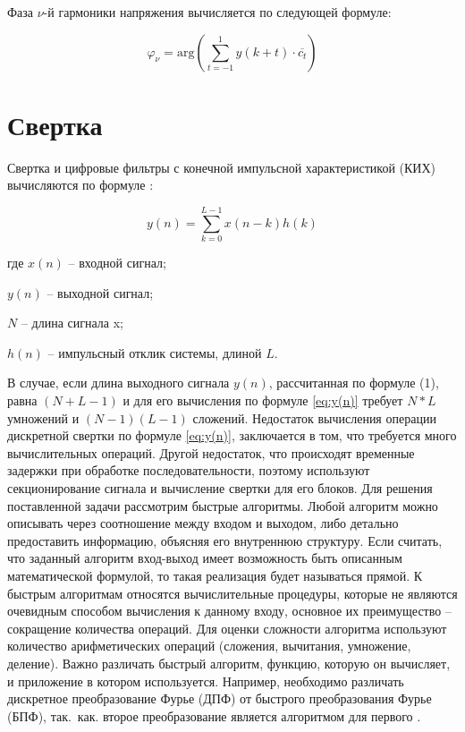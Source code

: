 Фаза  $\nu$-й гармоники напряжения вычисляется по следующей формуле:

\begin{equation}
	\label{eq:equation3.13}
	\varphi_\nu = \mathrm{arg} \left({\displaystyle\sum_{t=-1}^{1} y(k+t) \cdot \overline{c_t} }\right)
\end{equation}



\section{Свертка} \label{sec:ch3/sect3}
Свертка и цифровые фильтры с конечной импульсной характеристикой (КИХ) вычисляются по формуле \cite{McClellan1983Application}:

\begin{equation}
\label{eq:y(n)}
	y(n) = \sum_{k=0}^{L-1}x(n-k)h(k)
\end{equation}

где $x(n)$ -- входной сигнал;

$y(n)$ -- выходной сигнал; 

$N$ -- длина сигнала x;

$h(n)$ -- импульсный отклик системы, длиной $L$. 

В случае, если длина выходного сигнала $y(n)$,  рассчитанная по формуле (1), равна $(N+L-1)$ и для его вычисления по формуле \ref{eq:y(n)} требует $N*L$ умножений и $(N-1)(L-1)$ сложений. 
Недостаток вычисления операции дискретной свертки по формуле \ref{eq:y(n)}, заключается в том, что требуется много вычислительных операций. Другой недостаток, что происходят временные задержки при обработке последовательности, поэтому используют секционирование сигнала и вычисление свертки для его блоков.
Для решения поставленной задачи рассмотрим быстрые алгоритмы. Любой алгоритм можно описывать через соотношение между входом и выходом, либо детально предоставить информацию, объясняя его внутреннюю структуру. Если считать, что заданный алгоритм вход-выход  имеет возможность  быть описанным математической формулой, то такая реализация будет называться прямой. К быстрым алгоритмам относятся вычислительные процедуры, которые не являются очевидным способом вычисления к данному входу, основное их преимущество – сокращение количества операций.  Для оценки сложности алгоритма используют количество арифметических операций (сложения, вычитания, умножение, деление). Важно различать быстрый алгоритм, функцию, которую он вычисляет, и приложение в котором используется. Например, необходимо различать дискретное преобразование Фурье (ДПФ) от быстрого преобразования Фурье (БПФ), так.~как.  второе преобразование является  алгоритмом для первого \cite{bluehut1989fast}. 

